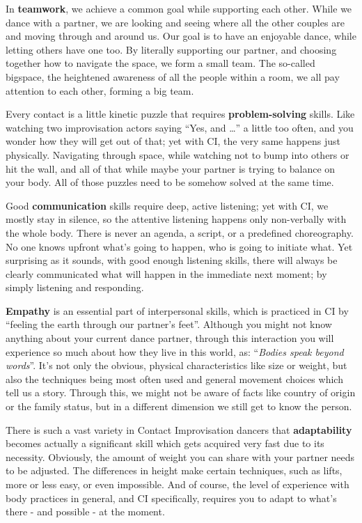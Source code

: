 In \textbf{teamwork}, we achieve a common goal while supporting each other.
While we dance with a partner, we are looking and seeing where all the other couples are and moving through and around us.
Our goal is to have an enjoyable dance, while letting others have one too.
By literally supporting our partner, and choosing together how to navigate the space, we form a small team.
The so-called \gls{bigspace}, the heightened awareness of all the people within a room, we all pay attention to each other, forming a big team.

Every contact is a little kinetic puzzle that requires \textbf{problem-solving} skills.
Like watching two improvisation actors saying ``Yes, and \ldots'' a little too often, and you wonder how they will get out of that; yet with CI, the very same happens just physically.
Navigating through space, while watching not to bump into others or hit the wall, and all of that while maybe your partner is trying to balance on your body.
All of those puzzles need to be somehow solved at the same time.

Good \textbf{communication} skills require deep, active listening;
yet with CI, we mostly stay in silence, so the attentive listening happens only non-verbally with the whole body.
There is never an agenda, a script, or a predefined choreography.
No one knows upfront what's going to happen, who is going to initiate what.
Yet surprising as it sounds, with good enough listening skills, there will always be clearly communicated what will happen in the immediate next moment; by simply listening and responding.

\textbf{Empathy} is an essential part of interpersonal skills, which is practiced in CI by ``feeling the earth through our partner's feet''.
Although you might not know anything about your current dance partner, through this interaction you will experience so much about how they live in this world, as: ``\textit{Bodies speak beyond words}''.
It's not only the obvious, physical characteristics like size or weight, but also the techniques being most often used and general movement choices which tell us a story.
Through this, we might not be aware of facts like country of origin or the family status, but in a different dimension we still get to know the person.

There is such a vast variety in Contact Improvisation dancers that \textbf{adaptability} becomes actually a significant skill which gets acquired very fast due to its necessity.
Obviously, the amount of weight you can share with your partner needs to be adjusted.
The differences in height make certain techniques, such as lifts, more or less easy, or even impossible.
And of course, the level of experience with body practices in general, and CI specifically, requires you to adapt to what's there - and possible - at the moment.


